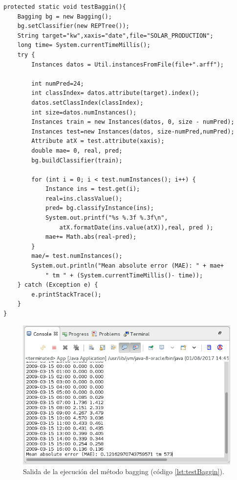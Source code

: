 \begin{lstlisting}[frame=single]  
protected static void testBaggin(){
	Bagging bg = new Bagging();
	bg.setClassifier(new REPTree());
	String target="kw",xaxis="date",file="SOLAR_PRODUCTION";
	long time= System.currentTimeMillis();
	try { 
		Instances datos = Util.instancesFromFile(file+".arff");
		
		int numPred=24;
		int classIndex= datos.attribute(target).index();
		datos.setClassIndex(classIndex);
		int size=datos.numInstances();
		Instances train = new Instances(datos, 0, size - numPred);
		Instances test=new Instances(datos, size-numPred,numPred);
		Attribute atX = test.attribute(xaxis);
		double mae= 0, real, pred;
		bg.buildClassifier(train);
		
		for (int i = 0; i < test.numInstances(); i++) {
			Instance ins = test.get(i);
			real=ins.classValue();
			pred= bg.classifyInstance(ins);
			System.out.printf("%s %.3f %.3f\n",
				atX.formatDate(ins.value(atX)),real, pred );
			mae+= Math.abs(real-pred);
		}
		mae/= test.numInstances();
		System.out.println("Mean absolute error (MAE): " + mae+ 
			" tm " + (System.currentTimeMillis()- time));
	} catch (Exception e) {
		e.printStackTrace();
	}
}
\end{lstlisting}

\begin{figure}[ht]
	\centering
	\includegraphics[width=13.5cm]{img/salidaConsolaBagging.png}
	\caption{Salida de la ejecución del método bagging (código \ref{lst:testBaggin}).}
	\label{fig:salidaConsolaBagging}
\end{figure}

